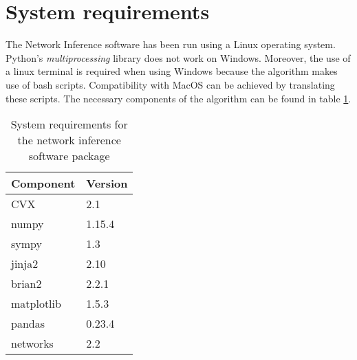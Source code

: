 \section{System requirements}

The Network Inference software has been run using a Linux operating system. Python's \textit{multiprocessing} library does not work on Windows. Moreover, the use of a linux terminal is required when using Windows because the algorithm makes use of bash scripts. Compatibility with MacOS can be achieved by translating these scripts. The necessary components of the algorithm can be found in table \ref{tab:requirements}.



\begin{table}[H]
\centering
\begin{tabular}{|l|l|}
\hline
Component  & Version \\ \hline
CVX				 & 2.1		 \\ \hline
numpy      & 1.15.4  \\ \hline
sympy      & 1.3     \\ \hline
jinja2     & 2.10    \\ \hline
brian2     & 2.2.1   \\ \hline
matplotlib & 1.5.3   \\ \hline
pandas     & 0.23.4  \\ \hline
networks   & 2.2     \\ \hline
\end{tabular}
\caption{System requirements for the network inference software package}
\label{tab:requirements}
\end{table}







